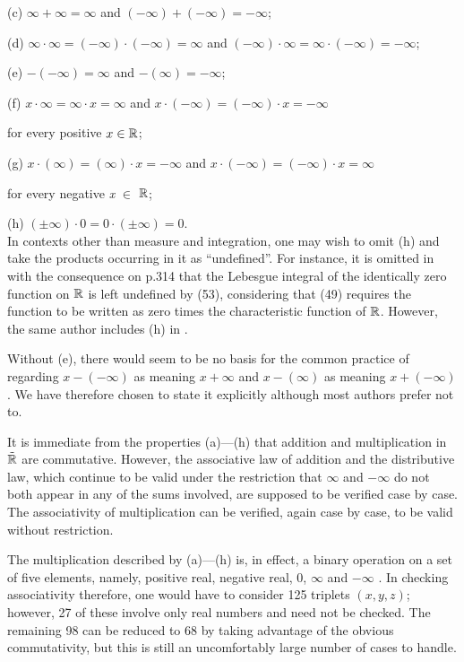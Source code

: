 \documentclass{article}
\begin{document}
(c) $\infty+\infty=\infty$ and $(-\infty)+(-\infty)=-\infty$;

(d) $\infty\cdot\infty=(-\infty)\cdot(-\infty)=\infty$ and
 $(-\infty)\cdot\infty=\infty\cdot(-\infty)=-\infty$;


(e) $-(-\infty)=\infty$ and $-(\infty)=-\infty$;

(f) $x\cdot\infty=\infty\cdot x=\infty$ and $x\cdot(-\infty)=(-\infty)\cdot x=-\infty$

\indent \indent \indent for every positive $x\in\bf
{\mathbb R}$;

(g) $x\cdot(\infty)=(\infty)\cdot x=-\infty$ and $x\cdot(-\infty)=(-\infty)\cdot x=\infty$

\indent \indent \indent for every negative \textit{x} $\in$ ${\bf
{\mathbb R}}$;

(h) $(\pm\infty)\cdot 0=0\cdot(\pm\infty)=0$.\\



\noindent In contexts other than measure and integration, one may
wish to omit (h) and take the products occurring in it as
``undefined''. For instance, it is omitted in \cite[p.12] {rudin1}
with the consequence on p.314 that the Lebesgue integral of the
identically zero function on ${\bf {\mathbb R}}$ is left undefined
by (53), considering that (49) requires the function to be written
as zero times the characteristic function of ${\bf {\mathbb R}}$.
However, the same author includes (h) in \cite[p.19] {rudin2}.

Without (e), there would seem to be no basis for the common
practice of regarding $x-(-\infty)$ as meaning $x+\infty$ and
$x-(\infty)$ as meaning $x+(-\infty)$. We have therefore chosen to
state it explicitly although most authors prefer not to.


It is immediate from the properties (a)---(h) that addition and multiplication
in $\tilde{{\bf {\mathbb R}}}$ are commutative. However, the
associative law of addition and the distributive law, which
continue to be valid under the restriction that $\infty$ and
$-\infty $ do not both appear in any of the sums involved, are
supposed to be verified case by case. The associativity of
multiplication can be verified, again case by case, to be valid
without restriction.

The multiplication described by (a)---(h) is, in effect, a
binary operation on a set of five elements, namely,
positive real, negative real, 0, $\infty$  and $-\infty$ . In
checking associativity therefore, one would have to consider 125
triplets $(x,y,z)$; however, 27 of these involve only real numbers
and need not be checked. The remaining 98 can be reduced to 68 by
taking advantage of the obvious commutativity, but this is still an
uncomfortably large number of cases to handle.
\end{document}
